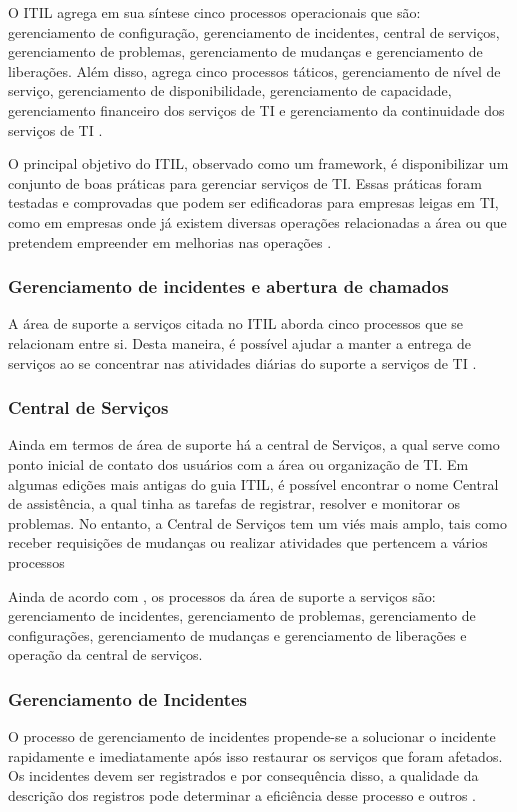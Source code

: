 O ITIL agrega em sua síntese cinco processos operacionais que são: gerenciamento de configuração, gerenciamento de incidentes, central de serviços, gerenciamento de problemas, gerenciamento de mudanças e gerenciamento de liberações. Além disso, agrega cinco processos táticos, gerenciamento de nível de serviço, gerenciamento de disponibilidade, gerenciamento de capacidade, gerenciamento financeiro dos serviços de TI e gerenciamento da continuidade dos serviços de TI \citep{vanharen_2006}.

O principal objetivo do ITIL, observado como um framework, é disponibilizar um conjunto de boas práticas para gerenciar serviços de TI. Essas práticas foram testadas e comprovadas que podem ser edificadoras para empresas leigas em TI,  como em empresas onde já existem diversas operações relacionadas a área ou que pretendem empreender em melhorias nas operações \citep{ogc_itil}.

\subsubsection{Gerenciamento de incidentes e abertura de chamados}
A área de suporte a serviços citada no ITIL aborda cinco processos que se relacionam entre si. Desta maneira, é possível  ajudar a manter a entrega de serviços ao se concentrar nas atividades diárias do suporte a serviços de TI \citep{vanharen_2006}.

\subsubsection{Central de Serviços}
Ainda em termos de área de suporte há a central de Serviços, a qual serve como ponto inicial de contato dos usuários com a área ou organização de TI. Em algumas edições mais antigas do guia ITIL, é possível encontrar o nome Central de assistência, a qual tinha as tarefas de registrar, resolver e monitorar os problemas. No entanto, a Central de Serviços tem um viés mais amplo, tais como receber requisições de mudanças ou realizar atividades que pertencem a vários processos

Ainda de acordo com \citet{vanharen_2006}, os processos da  área de suporte a serviços são: gerenciamento de incidentes, gerenciamento de problemas, gerenciamento de configurações, gerenciamento de mudanças e gerenciamento de liberações e operação da central de serviços.

\subsubsection{Gerenciamento de Incidentes}
O processo de gerenciamento de incidentes propende-se a solucionar o incidente rapidamente e imediatamente após isso restaurar os serviços que foram afetados. Os incidentes devem ser registrados e por consequência disso, a qualidade da descrição dos registros pode determinar a eficiência desse processo e outros \citep{ogc_itil}. 

